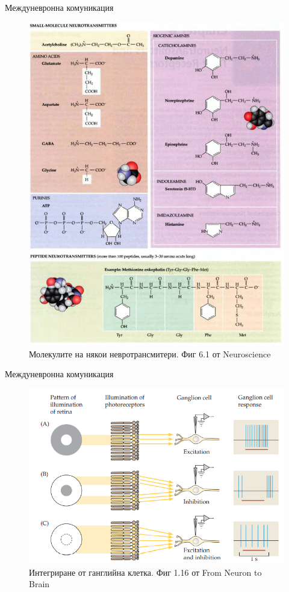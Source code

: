 \begin{frame}[t]{Междуневронна комуникация}
  \begin{figure}[htbp!]
    \centering
    \includegraphics[width=\textwidth,height=0.7\textheight,keepaspectratio]{neurotransmitters.PNG}
    \caption{Молекулите на някои невротрансмитери. Фиг 6.1 от Neuroscience}
  \end{figure}
\end{frame}

\begin{frame}[t]{Междуневронна комуникация}
  \begin{figure}[htbp!]
    \centering
    \includegraphics[width=\textwidth,height=0.7\textheight,keepaspectratio]{gangleon-integration.PNG}
    \caption{Интегриране от ганглийна клетка. Фиг 1.16 от From Neuron to Brain}
  \end{figure}
\end{frame}


